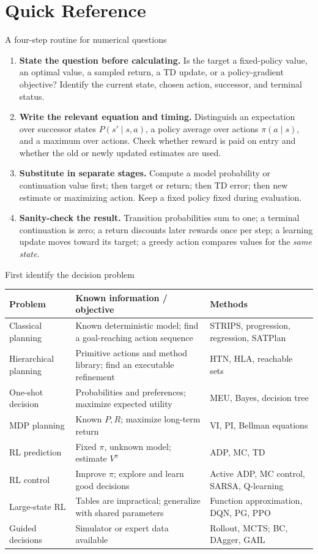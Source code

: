 \documentclass[10pt,a4paper]{article}
\begin{document}
\section*{Quick Reference}
\begin{card}{A four-step routine for numerical questions}
\begin{enumerate}
\item \textbf{State the question before calculating.} Is the target a fixed-policy value, an optimal value, a sampled return, a TD update, or a policy-gradient objective? Identify the current state, chosen action, successor, and terminal status.
\item \textbf{Write the relevant equation and timing.} Distinguish an expectation over successor states $P(s'\mid s,a)$, a policy average over actions $\pi(a\mid s)$, and a maximum over actions. Check whether reward is paid on entry and whether the old or newly updated estimates are used.
\item \textbf{Substitute in separate stages.} Compute a model probability or continuation value first; then target or return; then TD error; then new estimate or maximizing action. Keep a fixed policy fixed during evaluation.
\item \textbf{Sanity-check the result.} Transition probabilities sum to one; a terminal continuation is zero; a return discounts later rewards once per step; a learning update moves toward its target; a greedy action compares values for the \emph{same state}.
\end{enumerate}
\end{card}
\begin{card}{First identify the decision problem}
\small
\par\smallskip
\begin{tabularx}{\linewidth}{@{}P{2.4cm}Y Y@{}}
\toprule Problem & Known information / objective & Methods \\\midrule
Classical planning & Known deterministic model; find a goal-reaching action sequence & STRIPS, progression, regression, SATPlan \\
Hierarchical planning & Primitive actions and method library; find an executable refinement & HTN, HLA, reachable sets \\
One-shot decision & Probabilities and preferences; maximize expected utility & MEU, Bayes, decision tree \\
MDP planning & Known $P,R$; maximize long-term return & VI, PI, Bellman equations \\
RL prediction & Fixed $\pi$, unknown model; estimate $V^\pi$ & ADP, MC, TD \\
RL control & Improve $\pi$; explore and learn good decisions & Active ADP, MC control, SARSA, Q-learning \\
Large-state RL & Tables are impractical; generalize with shared parameters & Function approximation, DQN, PG, PPO \\
Guided decisions & Simulator or expert data available & Rollout, MCTS; BC, DAgger, GAIL \\\bottomrule
\end{tabularx}\par\smallskip
\end{card}
\end{document}
